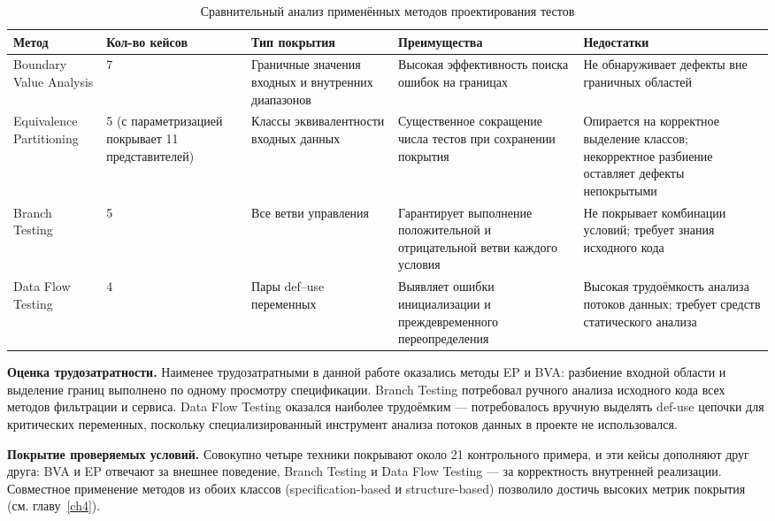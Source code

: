 \begin{table}[ht]
\centering\small
\caption{Сравнительный анализ применённых методов проектирования тестов}
\label{tab:methods-compare}
\begin{tabular}{|p{3.0cm}|p{2.0cm}|p{3.5cm}|p{3.0cm}|p{2.5cm}|}
\hline
\textbf{Метод} & \textbf{Кол-во кейсов} & \textbf{Тип покрытия} & \textbf{Преимущества} & \textbf{Недостатки} \\
\hline
Boundary Value Analysis & 7 & Граничные значения входных и внутренних диапазонов & Высокая эффективность поиска ошибок на границах & Не обнаруживает дефекты вне граничных областей \\
\hline
Equivalence Partitioning & 5 (с параметризацией покрывает 11 представителей) & Классы эквивалентности входных данных & Существенное сокращение числа тестов при сохранении покрытия & Опирается на корректное выделение классов; некорректное разбиение оставляет дефекты непокрытыми \\
\hline
Branch Testing & 5 & Все ветви управления & Гарантирует выполнение положительной и отрицательной ветви каждого условия & Не покрывает комбинации условий; требует знания исходного кода \\
\hline
Data Flow Testing & 4 & Пары def--use переменных & Выявляет ошибки инициализации и преждевременного переопределения & Высокая трудоёмкость анализа потоков данных; требует средств статического анализа \\
\hline
\end{tabular}
\end{table}

\textbf{Оценка трудозатратности.} Наименее трудозатратными в данной работе оказались методы EP и BVA: разбиение входной области и выделение границ выполнено по одному просмотру спецификации. Branch Testing потребовал ручного анализа исходного кода всех методов фильтрации и сервиса. Data Flow Testing оказался наиболее трудоёмким --- потребовалось вручную выделять def-use цепочки для критических переменных, поскольку специализированный инструмент анализа потоков данных в проекте не использовался.

\textbf{Покрытие проверяемых условий.} Совокупно четыре техники покрывают около 21 контрольного примера, и эти кейсы дополняют друг друга: BVA и EP отвечают за внешнее поведение, Branch Testing и Data Flow Testing --- за корректность внутренней реализации. Совместное применение методов из обоих классов (specification-based и structure-based) позволило достичь высоких метрик покрытия (см. главу~\ref{ch4}).


